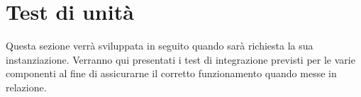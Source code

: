 \documentclass[PianoDiQualifica.tex]{subfiles}
\begin{document}
\chapter{Test di unità}
Questa sezione verrà sviluppata in seguito quando sarà richiesta la sua instanziazione.
Verranno qui presentati i test di integrazione previsti per le varie componenti al fine di assicurarne il corretto funzionamento quando messe in relazione.
\end{document}
